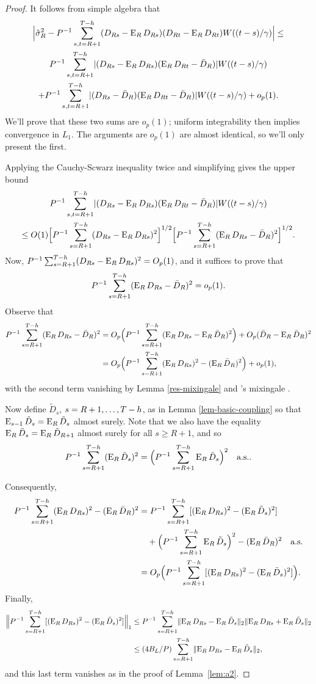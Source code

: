 \documentclass[11pt]{article}
\newcommand{\citepos}[1]{\citeauthor{#1}'s \citeyearpar{#1}}
\begin{document}
\begin{proof}
   It follows from simple algebra that
\begin{multline*}
  \Big| \hat\sigma_R^2 -  P^{-1} \sum_{s,t=R+1}^{T-h} (D_{Rs} - \operatorname{E}_R
    D_{Rs}) (D_{Rt} - \operatorname{E}_R D_{Rt}) W((t-s)/\gamma) \Big| \leq\\
  P^{-1} \sum_{s,t=R+1}^{T-h} \lvert (D_{Rs} - \operatorname{E}_R D_{Rs})(\operatorname{E}_R D_{Rt} - \bar{D}_{R}) \rvert W((t-s)/\gamma) \\ + P^{-1} \sum_{s,t=R+1}^{T-h} \lvert (D_{Rs} -
  \bar{D}_{R})(\operatorname{E}_R D_{Rt} - \bar{D}_{R}) \rvert W((t-s)/\gamma) + o_p(1).
\end{multline*}
We'll prove that these two sums are $o_p(1)$; uniform integrability
then implies convergence in $L_1$.  The arguments are $o_p(1)$ are
almost identical, so we'll only present the first.

Applying the Cauchy-Scwarz inequality twice and simplifying gives the
upper bound
\begin{multline*}
P^{-1} \sum_{s,t=R+1}^{T-h} \lvert (D_{Rs} - \operatorname{E}_R D_{Rs})(\operatorname{E}_R D_{Rt} - \bar{D}_{R}) \rvert W((t-s)/\gamma) \\ \leq O(1) \Big[P^{-1} \sum_{s=R+1}^{T-h} (D_{Rs} - \operatorname{E}_R D_{Rs})^2\Big]^{1/2} \Big[P^{-1} \sum_{s=R+1}^{T-h}(\operatorname{E}_R D_{Rs} - \bar{D}_{R} )^2\Big]^{1/2}.
\end{multline*}
Now,
$P^{-1} \sum_{s=R+1}^{T-h}(D_{Rs} - \operatorname{E}_R D_{Rs})^2 = O_p(1)$, and it suffices to prove
that \[P^{-1} \sum_{s=R+1}^{T-h}(\operatorname{E}_R D_{Rs} - \bar{D}_{R} )^2 = o_p(1).\]  Observe that
\begin{align*}
  P^{-1} \sum_{s=R+1}^{T-h}(\operatorname{E}_R D_{Rs} - \bar{D}_{R} )^2 & = O_p\Big(P^{-1} \sum_{s=R+1}^{T-h}(\operatorname{E}_{R}D_{Rs} -
  \operatorname{E}_R\bar{D}_{R})^2\Big) + O_p(\bar{D}_{R} - \operatorname{E}_R\bar{D}_{R})^{2} \\
  &= O_p\Big(P^{-1} \sum_{s=R+1}^{T-h} (\operatorname{E}_RD_{Rs})^2 - (\operatorname{E}_R\bar{D}_{R})^2\Big) +
  o_p(1),
\end{align*}
with the second term vanishing by Lemma \ref{res-mixingale} and
\citepos{Dav:93} mixingale \lln.

Now define $\tilde D_s$, $s = R+1,\dots,T-h$, as in Lemma
\ref{lem-basic-coupling} so that $\operatorname{E}_{s-1} \tilde D_s = \operatorname{E}_R \tilde
D_s$ almost surely.  Note that we also have the equality $\operatorname{E}_R \tilde
D_s = \operatorname{E}_R \tilde D_{R+1}$ almost surely for all $s\geq R+1$, and so
\[
P^{-1} \sum_{s=R+1}^{T-h} (\operatorname{E}_R \tilde D_s)^2 = \Big(P^{-1} \sum_{s=R+1}^{T-h} \operatorname{E}_R
\tilde D_s\Big)^2 \quad \text{a.s..}
\]

Consequently,
\begin{align*}
P^{-1} \sum_{s=R+1}^{T-h} (\operatorname{E}_R D_{Rs})^2 - (\operatorname{E}_R\bar{D}_{R})^2 & = 
P^{-1} \sum_{s=R+1}^{T-h} [(\operatorname{E}_R D_{Rs})^2 - (\operatorname{E}_R\tilde D_s)^2]\\
&\quad+ \Big(P^{-1} \sum_{s=R+1}^{T-h} \operatorname{E}_R \tilde D_s\Big)^2 - (\operatorname{E}_R\bar{D}_{R})^2 \quad \text{a.s}.\\
&= O_p\Big(P^{-1} \sum_{s=R+1}^{T-h} [(\operatorname{E}_R D_{Rs})^2 - (\operatorname{E}_R \tilde D_s)^2]\Big).
\end{align*}
Finally, 
\begin{align*}
\Big\lVert P^{-1} \sum_{s=R+1}^{T-h} [(\operatorname{E}_RD_{Rs})^2 - (\operatorname{E}_R \tilde D_s)^2] \Big\rVert_1
&\leq P^{-1} \sum_{s=R+1}^{T-h} \lVert \operatorname{E}_RD_{Rs} - \operatorname{E}_R \tilde D_s \rVert_2 \lVert
\operatorname{E}_RD_{Rs} + \operatorname{E}_R \tilde D_s \rVert_2
\\ &\leq (4 B_L/P) \sum_{s=R+1}^{T-h} \lVert \operatorname{E}_RD_{Rs} - \operatorname{E}_R \tilde D_s \rVert_2,
\end{align*}
and this last term vanishes as in the proof of Lemma~\ref{lem:a2}.
\end{proof}
\end{document}

